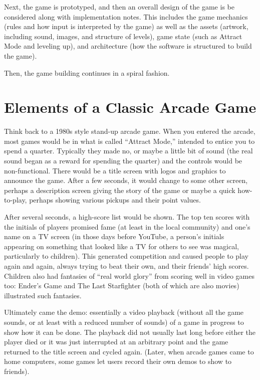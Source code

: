 \documentclass[12pt]{amsbook}
\theoremstyle{definition}
\theoremstyle{remark}
\numberwithin{figure}{chapter}
\numberwithin{table}{chapter}
\numberwithin{section}{chapter}
\numberwithin{equation}{section}
\begin{document}
Next, the game is prototyped, and then an overall design of the game is be considered along with implementation notes.  This includes the game mechanics (rules and how input is interpreted by the game) as well as the assets (artwork, including sound, images, and structure of levels),  game state (such as Attract Mode and leveling up), and architecture (how the software is structured to build the game). 
 
Then, the game building continues in a spiral fashion.

\section{Elements of a Classic Arcade Game}

Think back to a 1980s style stand-up arcade game.  When you entered the arcade, most games would be in what is called ``Attract Mode,'' intended to entice you to spend a quarter.  Typically they made no, or maybe a little bit of sound (the real sound began as a reward for spending the quarter) and the controls would be non-functional.  There would be a title screen with logos and graphics to announce the game.  After a few seconds, it would change to some other screen, perhaps a description screen giving the story of the game or maybe a quick how-to-play, perhaps showing various pickups and their point values.  

After several seconds, a high-score list would be shown.  The top ten scores with the initials of players promised fame (at least in the local community) and one's name on a TV screen (in those days before YouTube, a person's initials appearing on something that looked like a TV for others to see was magical, particularly to children).  This generated competition and caused people to play again and again, always trying to beat their own, and their friends' high scores. Children also had fantasies of ``real world glory'' from scoring well in video games too: Ender's Game \cite{Car94} and The Last Starfighter\cite{Fos84} (both of which are also movies) illustrated such fantasies.

Ultimately came the demo: essentially a video playback (without all the game sounds, or at least with a reduced number of sounds) of a game in progress to show how it can be done.  The playback did not usually last long before either the player died or it was just interrupted at an arbitrary point and the game returned to the title screen and cycled again.  (Later, when arcade games came to home computers, some games let users record their own demos to show to friends).
\end{document}
